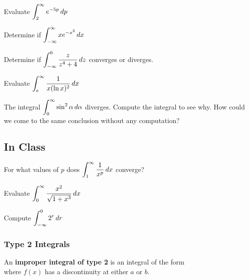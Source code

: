 \documentclass[notes]{subfiles}
\begin{document}
		\begin{ex}
			Evaluate $\displaystyle \int_2^\infty e^{-5p}\, dp$
		\end{ex}
			
		\begin{ex}
			Determine if $\displaystyle \int_{-\infty}^{\infty} xe^{-x^2}\, dx$
		\end{ex}
			\newpage
			
		\begin{ex}
			Determine if $\displaystyle \int_{-\infty}^0 \dfrac{z}{z^4 + 4}\, dz$ converges or diverges.
		\end{ex}
			
		\begin{ex}
			Evaluate $\displaystyle \int_e^\infty \dfrac{1}{x(\ln x)^2}\, dx$
		\end{ex}
			
		\begin{ex}
			The integral $\displaystyle \int_0^\infty \sin^2\alpha\, d\alpha$ diverges.  Compute the integral to see why.  How could we come to the same conclusion without any computation?
		\end{ex}
			\newpage
			
	\subsection*{In Class}
		\begin{ex}
			For what values of $p$ does $\displaystyle \int_1^\infty \dfrac{1}{x^p}\, dx$ converge?
		\end{ex}
		
		\begin{ex}
			Evaluate $\displaystyle \int_0^\infty \dfrac{x^2}{\sqrt{1+x^3}}\, dx$
		\end{ex}	
		
		\begin{ex}
			Compute $\displaystyle \int_{-\infty}^0 2^r\, dr$
		\end{ex}	
			\newpage
			
	\subsubsection*{Type 2 Integrals}

		\begin{defn}
			An \textbf{improper integral of type 2} is an integral of the form\\[70pt]
			where $f(x)$ has a discontinuity at either $a$ or $b$.
		\end{defn}
			
\end{document}
